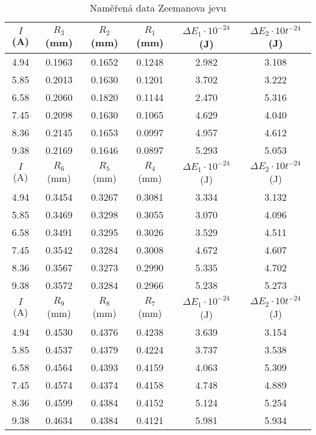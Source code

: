 \documentclass[a4paper,11pt]{article}
\begin{document}
\begin{table}[h]
    \centering
    \small
    \begin{tabular}{ | c | c c c | c c | }
        \hline
        $ I $ (A) & $ R_3 $ (mm) & $ R_2 $ (mm) & $ R_1 $ (mm) & $ \Delta E_1 \cdot 10^{-24} $ (J) &  $ \Delta E_2 \cdot 10t^{-24} $ (J)  \\
        \hline
        4.94 & 0.1963 & 0.1652 & 0.1248 & 2.982 & 3.108 \\
        5.85 & 0.2013 & 0.1630 & 0.1201 & 3.702 & 3.222 \\
        6.58 & 0.2060 & 0.1820 & 0.1144 & 2.470 & 5.316 \\
        7.45 & 0.2098 & 0.1630 & 0.1065 & 4.629 & 4.040 \\
        8.36 & 0.2145 & 0.1653 & 0.0997 & 4.957 & 4.612 \\
        9.38 & 0.2169 & 0.1646 & 0.0897 & 5.293 & 5.053 \\
        \hline                                 
        $ I $ (A) & $ R_6 $ (mm) & $ R_5              $ (mm) & $ R_4 $  (mm) & $ \Delta E_1 \cdot 10^{-24} $ (J) &  $ \Delta E_2 \cdot 10t^{-24} $ (J)    \\
        \hline                          
        4.94 & 0.3454 & 0.3267 & 0.3081 & 3.334 & 3.132 \\
        5.85 & 0.3469 & 0.3298 & 0.3055 & 3.070 & 4.096 \\
        6.58 & 0.3491 & 0.3295 & 0.3026 & 3.529 & 4.511 \\
        7.45 & 0.3542 & 0.3284 & 0.3008 & 4.672 & 4.607 \\
        8.36 & 0.3567 & 0.3273 & 0.2990 & 5.335 & 4.702 \\
        9.38 & 0.3572 & 0.3284 & 0.2966 & 5.238 & 5.273 \\
        \hline                                 
        $ I $ (A) & $ R_9 $ (mm) & $ R_8              $ (mm) & $ R_7 $  (mm) & $ \Delta E_1 \cdot 10^{-24} $ (J) &  $ \Delta E_2 \cdot 10t^{-24} $ (J)   \\
        \hline                          
        4.94 & 0.4530 & 0.4376 & 0.4238 & 3.639 & 3.154 \\ 
        5.85 & 0.4537 & 0.4379 & 0.4224 & 3.737 & 3.538 \\ 
        6.58 & 0.4564 & 0.4393 & 0.4159 & 4.063 & 5.309 \\ 
        7.45 & 0.4574 & 0.4374 & 0.4158 & 4.748 & 4.889 \\ 
        8.36 & 0.4599 & 0.4384 & 0.4152 & 5.124 & 5.254 \\ 
        9.38 & 0.4634 & 0.4384 & 0.4121 & 5.981 & 5.934 \\ 
        \hline
    \end{tabular}
    \caption{Naměřená data Zeemanova jevu}
\end{table}
\end{document}
